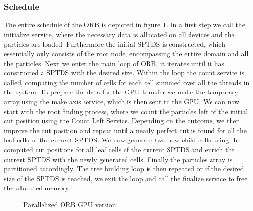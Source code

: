 \documentclass[]{article}
\begin{document}
\subsubsection{Schedule}

The entire schedule of the ORB is depicted in figure \ref{fig:orbgpup}. In a first step we call the initialize service, where the necessary data is allocated on all devices and the particles are loaded. Furthermore the initial SPTDS is constructed, which essentially only consists of the root node, encompassing the entire domain and all the particles. Next we enter the main loop of ORB, it iterates until it has constructed a SPTDS with the desired size. Within the loop the count service is called, computing the number of cells for each cell summed over all the threads in the system. To prepare the data for the GPU transfer we make the temporary array using the make axis service, which is then sent to the GPU. 
We can now start with the root finding process, where we count the particles left of the initial cut position using the Count Left Service. Depending on the outcome, we then improve the cut position and repeat until a nearly perfect cut is found for all the leaf cells of the current SPTDS. We now generate two new child cells using the computed cut positions for all leaf cells of the current SPTDS and enrich the current SPTDS with the newly generated cells. Finally the particles array is partitioned accordingly. 
The tree building loop is then repeated or if the desired size of the SPTDS is reached, we exit the loop and call the finalize service to free the allocated memory.


\begin{figure}[H]
	\begin{center}
	\end{center}
	\caption{Parallelized ORB GPU version}
	\label{fig:orbgpup}
\end{figure}
\end{document}
